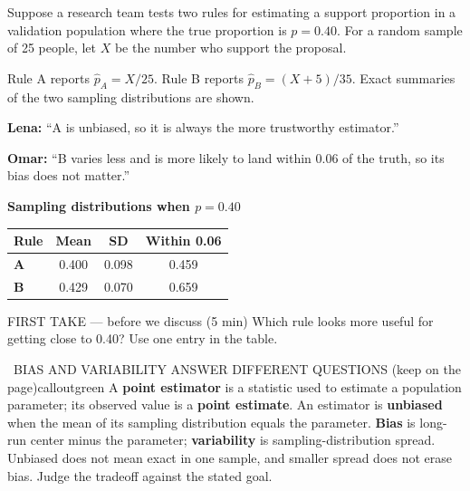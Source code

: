 \documentclass[11pt]{article}
\begin{document}


Suppose a research team tests two rules for estimating a support proportion in a validation population where the true proportion is $p=0.40$. For a random sample of 25 people, let $X$ be the number who support the proposal.\par\smallskip Rule A reports $\widehat p_A=X/25$. Rule B reports $\widehat p_B=(X+5)/35$. Exact summaries of the two sampling distributions are shown.\par\smallskip \textbf{Lena:} ``A is unbiased, so it is always the more trustworthy estimator.''\par \textbf{Omar:} ``B varies less and is more likely to land within 0.06 of the truth, so its bias does not matter.''\par
\begin{center}
\textbf{Sampling distributions when $p=0.40$}\par\smallskip
\begin{tabular}{|l|c|c|c|}
\hline
\textbf{Rule} & \textbf{Mean} & \textbf{SD} & \textbf{Within 0.06} \\ \hline
\textbf{A} & 0.400 & 0.098 & 0.459 \\ \hline
\textbf{B} & 0.429 & 0.070 & 0.659 \\ \hline
\end{tabular}
\end{center}
\begin{firsttakebox}{FIRST TAKE --- before we discuss (5 min)}
Which rule looks more useful for getting close to 0.40? Use one entry in the table.
\workspace{0.9in}
\end{firsttakebox}

\begin{callout}{\IconBook\ BIAS AND VARIABILITY ANSWER DIFFERENT QUESTIONS (keep on the page)}{calloutgreen}
A \textbf{point estimator} is a statistic used to estimate a population parameter; its observed value is a
\textbf{point estimate}. An estimator is \textbf{unbiased} when the mean of its sampling distribution equals the
parameter. \textbf{Bias} is long-run center minus the parameter; \textbf{variability} is sampling-distribution spread.
Unbiased does not mean exact in one sample, and smaller spread does not erase bias. Judge the tradeoff against the stated goal.
\end{callout}
\end{document}

